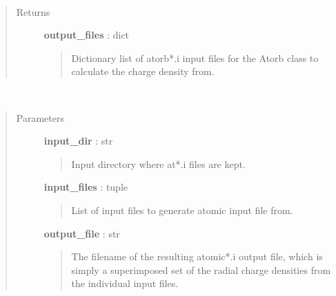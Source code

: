 \documentclass[letterpaper,10pt,english]{sphinxmanual}
\begin{document}
\begin{fulllineitems}
\begin{fulllineitems}
\begin{quote}
\begin{description}
\end{description}\end{quote}

\end{fulllineitems}


\begin{fulllineitems}
\label{modules:phaseshifts.model.MTZ_model.create_atorbs}~\begin{quote}\begin{description}
\item[{Returns}] \leavevmode
\textbf{output\_files} : dict
\begin{quote}

Dictionary list of atorb*.i input files for the Atorb class to
calculate the charge density from.
\end{quote}

\end{description}\end{quote}

\end{fulllineitems}


\begin{fulllineitems}
\label{modules:phaseshifts.model.MTZ_model.gen_atomic}~\begin{quote}\begin{description}
\item[{Parameters}] \leavevmode
\textbf{input\_dir} : str
\begin{quote}

Input directory where at*.i files are kept.
\end{quote}

\textbf{input\_files} : tuple
\begin{quote}

List of input files to generate atomic input file from.
\end{quote}

\textbf{output\_file} : str
\begin{quote}

The filename of the resulting atomic*.i output file, which is
simply a superimposed set of the radial charge densities from
the individual input files.
\end{quote}


\end{description}
\end{quote}
\end{fulllineitems}
\end{fulllineitems}
\end{document}

